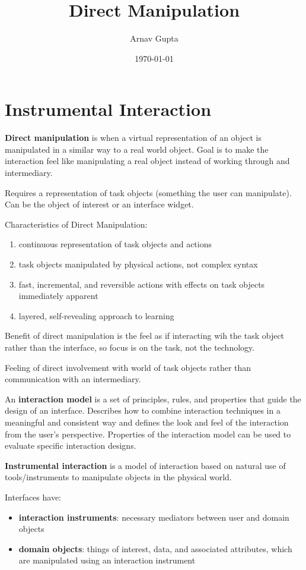 \documentclass[11pt]{article}
\author{Arnav Gupta}
\date{\today}
\title{Direct Manipulation}
\begin{document}
\maketitle
\tableofcontents

\section{Instrumental Interaction}
\label{sec:org12d4cce}
\textbf{Direct manipulation} is when a virtual representation of an object is manipulated in a similar
way to a real world object.
Goal is to make the interaction feel like manipulating a real object instead of working through
and intermediary.

Requires a representation of task objects (something the user can manipulate).
Can be the object of interest or an interface widget.

Characteristics of Direct Manipulation:
\begin{enumerate}
\item continuous representation of task objects and actions
\item task objects manipulated by physical actions, not complex syntax
\item fast, incremental, and reversible actions with effects on task objects immediately
apparent
\item layered, self-revealing approach to learning
\end{enumerate}

Benefit of direct manipulation is the feel as if interacting wih the task object rather than
the interface, so focus is on the task, not the technology.

Feeling of direct involvement with world of task objects rather than communication with an
intermediary.

An \textbf{interaction model} is a set of principles, rules, and properties that guide the design of
an interface. Describes how to combine interaction techniques in a meaningful and consistent
way and defines the look and feel of the interaction from the user's perspective.
Properties of the interaction model can be used to evaluate specific interaction designs.

\textbf{Instrumental interaction} is a model of interaction based on natural use of tools/instruments
to manipulate objects in the physical world.

Interfaces have:
\begin{itemize}
\item \textbf{interaction instruments}: necessary mediators between user and domain objects
\item \textbf{domain objects}: things of interest, data, and associated attributes, which are
manipulated using an interaction instrument
\end{itemize}
\end{document}
